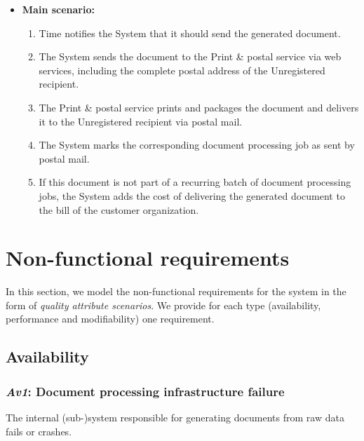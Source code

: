 \documentclass[a4paper,10pt]{article}
\begin{document}
\begin{itemize}
    \item \textbf{Main scenario:} 
    \begin{enumerate}
       \item Time notifies the System that it should send the generated document.
       \item The System sends the document to the Print \& postal service via web services, including the complete postal address of the Unregistered recipient.
       \item The Print \& postal service prints and packages the document and delivers it to the Unregistered recipient via postal mail. 
       \item The System marks the corresponding document processing job as sent by postal mail.
       \item If this document is not part of a recurring batch of document processing jobs, the System adds the cost of delivering the generated document to the bill of the customer organization.
    \end{enumerate}
\end{itemize}



\section{Non-functional requirements}\label{sec:non-functional}
In this section, we model the non-functional requirements for the system in the
form of \emph{quality attribute scenarios}. We provide for each type
(availability, performance and modifiability) one requirement.

\subsection{Availability}
\subsubsection{\emph{Av1}: Document processing infrastructure failure}
The internal (sub-)system responsible for generating documents from raw data fails or crashes.
\end{document}
